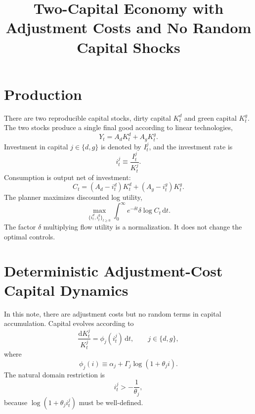 \documentclass[11pt]{article}
\title{Two-Capital Economy with Adjustment Costs and No Random Capital Shocks}
\author{}
\date{}
\newcommand{\dd}{\mathrm{d}}
\begin{document}
\maketitle

\section{Production}

There are two reproducible capital stocks, dirty capital $K^d_t$ and green capital $K^g_t$.
The two stocks produce a single final good according to linear technologies,
\begin{equation}
    Y_t = A_d K^d_t + A_g K^g_t .
\end{equation}
Investment in capital $j\in\{d,g\}$ is denoted by $I^j_t$, and the investment rate is
\begin{equation}
    i^j_t \equiv \frac{I^j_t}{K^j_t}.
\end{equation}
Consumption is output net of investment:
\begin{equation}
    C_t = (A_d-i^d_t)K^d_t + (A_g-i^g_t)K^g_t .
\end{equation}
The planner maximizes discounted log utility,
\begin{equation}
    \max_{\{i^d_t,i^g_t\}_{t\geq 0}}
    \int_0^\infty e^{-\delta t}\delta \log C_t\,\dd t .
\end{equation}
The factor $\delta$ multiplying flow utility is a normalization. It does not change the optimal controls.

\section{Deterministic Adjustment-Cost Capital Dynamics}

In this note, there are adjustment costs but no random terms in capital accumulation. Capital evolves according to
\begin{equation}
    \frac{\dd K^j_t}{K^j_t}
    = \phi_j(i^j_t)\,\dd t,
    \qquad j\in\{d,g\},
\end{equation}
where
\begin{equation}
    \phi_j(i)
    \equiv
    \alpha_j+\Gamma_j\log(1+\theta_j i).
\end{equation}
The natural domain restriction is
\begin{equation}
    i^j_t> -\frac{1}{\theta_j},
\end{equation}
because $\log(1+\theta_j i^j_t)$ must be well-defined.
\end{document}
